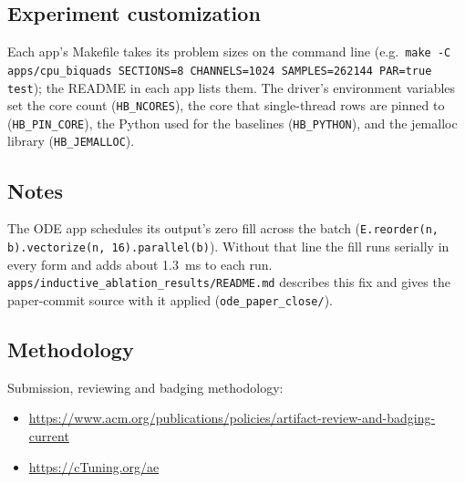 \subsection{Experiment customization}

Each app's Makefile takes its problem sizes on the command line (e.g.\
\texttt{make -C apps/cpu\_biquads SECTIONS=8 CHANNELS=1024 SAMPLES=262144
PAR=true test}); the README in each app lists them. The driver's environment
variables set the core count (\texttt{HB\_NCORES}), the core that
single-thread rows are pinned to (\texttt{HB\_PIN\_CORE}), the Python used for
the baselines (\texttt{HB\_PYTHON}), and the jemalloc library
(\texttt{HB\_JEMALLOC}).

\subsection{Notes}

The ODE app schedules its output's zero fill across the batch
(\texttt{E.reorder(n, b).vectorize(n, 16).parallel(b)}). Without that line
the fill runs serially in every form and adds about 1.3~ms to each run.
\texttt{apps/inductive\_ablation\_results/README.md} describes this fix and
gives the paper-commit source with it applied
(\texttt{ode\_paper\_close/}).

\subsection{Methodology}

Submission, reviewing and badging methodology:
\begin{itemize}
  \item \url{https://www.acm.org/publications/policies/artifact-review-and-badging-current}
  \item \url{https://cTuning.org/ae}
\end{itemize}
